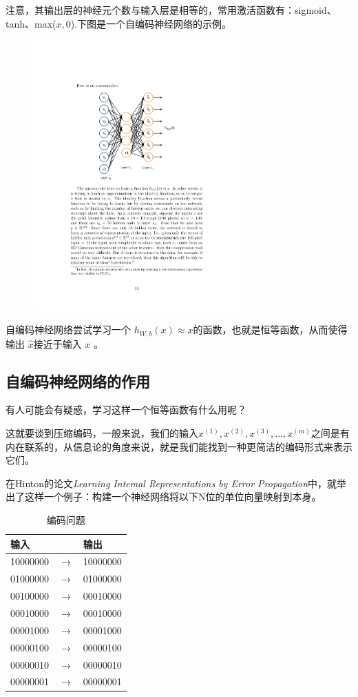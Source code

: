 注意，其输出层的神经元个数与输入层是相等的，常用激活函数有：sigmoid、tanh、max($x,0$).下图是一个自编码神经网络的示例。


\begin{figure}[H]
\centering
\includegraphics[width=8cm]{fig/1_1.pdf}
\end{figure}


自编码神经网络尝试学习一个 $ h_{W,b}(x) \approx x $的函数，也就是恒等函数，从而使得输出 $ \hat{x} $接近于输入 $ x$ 。

\subsection{自编码神经网络的作用}
有人可能会有疑惑，学习这样一个恒等函数有什么用呢？

这就要谈到压缩编码，一般来说，我们的输入$ x^{(1)}, x^{(2)}, x^{(3)}, \ldots, x^{(m)}$之间是有内在联系的，从信息论的角度来说，就是我们能找到一种更简洁的编码形式来表示它们。

在Hinton的论文\emph{Learning Intemal Representations
by Error Propagation}中，就举出了这样一个例子：构建一个神经网络将以下N位的单位向量映射到本身。
\begin{table}[!tbh]
\caption{\quad 编码问题}
\centering
\begin{tabular}{c c c}  \hline
\qquad 输入\,\,\,\,\,\,\,\,\,\,\,\, &	&\qquad 输出\,\,\,\,\,\,\,\,\,\,\,\, \\ \hline
10000000&$\rightarrow$&10000000\\
01000000&$\rightarrow$&01000000\\
00100000&$\rightarrow$&00010000\\
00010000&$\rightarrow$&00010000\\
00001000&$\rightarrow$&00001000\\
00000100&$\rightarrow$&00000100\\
00000010&$\rightarrow$&00000010\\
00000001&$\rightarrow$&00000001\\\hline
\end{tabular}
\label{Tcode1}
\end{table}



